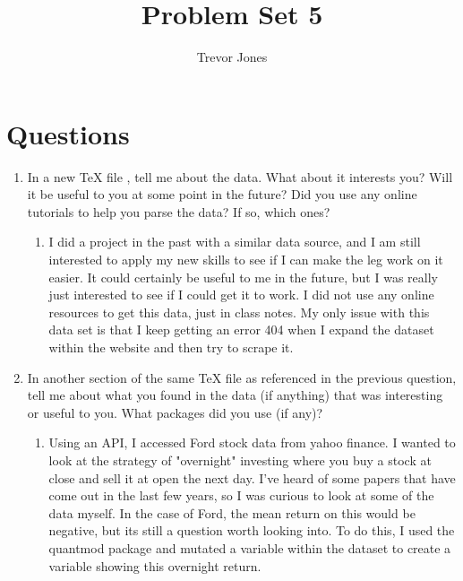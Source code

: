 \documentclass{article}
\title{Problem Set 5}
\author{Trevor Jones}
\begin{document}
\maketitle

\section{Questions}
\begin{enumerate}
    \item In a new TeX file , tell me about the data. What about it interests you? Will it be useful to you at some point in the future? Did you use any online tutorials to help you parse the data? If so, which ones?
    \begin{enumerate}
        \item I did a project in the past with a similar data source, and I am still interested to apply my new skills to see if I can make the leg work on it easier. It could certainly be useful to me in the future, but I was really just interested to see if I could get it to work. I did not use any online resources to get this data, just in class notes. My only issue with this data set is that I keep getting an error 404 when I expand the dataset within the website and then try to scrape it. 
    \end{enumerate}
    \item In another section of the same TeX file as referenced in the previous question, tell me about what you found in the data (if anything) that was interesting or useful to you. What packages did you use (if any)?
    \begin{enumerate}
        \item Using an API, I accessed Ford stock data from yahoo finance. I wanted to look at the strategy of "overnight" investing where you buy a stock at close and sell it at open the next day. I've heard of some papers that have come out in the last few years, so I was curious to look at some of the data myself. In the case of Ford, the mean return on this would be negative, but its still a question worth looking into. To do this, I used the quantmod package and mutated a variable within the dataset to create a variable showing this overnight return. 
    \end{enumerate}
\end{enumerate}
\end{document}
